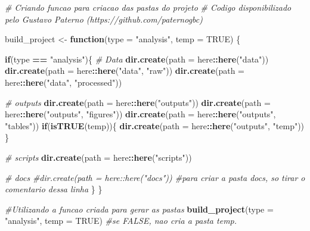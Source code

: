 \documentclass[
]{book}
\newenvironment{Shaded}{\begin{snugshade}}{\end{snugshade}}
\newcommand{\AttributeTok}[1]{\textcolor[rgb]{0.13,0.29,0.53}{#1}}
\newcommand{\CommentTok}[1]{\textcolor[rgb]{0.56,0.35,0.01}{\textit{#1}}}
\newcommand{\ConstantTok}[1]{\textcolor[rgb]{0.56,0.35,0.01}{#1}}
\newcommand{\ControlFlowTok}[1]{\textcolor[rgb]{0.13,0.29,0.53}{\textbf{#1}}}
\newcommand{\FunctionTok}[1]{\textcolor[rgb]{0.13,0.29,0.53}{\textbf{#1}}}
\newcommand{\NormalTok}[1]{#1}
\newcommand{\OtherTok}[1]{\textcolor[rgb]{0.56,0.35,0.01}{#1}}
\newcommand{\SpecialCharTok}[1]{\textcolor[rgb]{0.81,0.36,0.00}{\textbf{#1}}}
\newcommand{\StringTok}[1]{\textcolor[rgb]{0.31,0.60,0.02}{#1}}
\begin{document}
\begin{Shaded}
\begin{Highlighting}[]
\CommentTok{\# Criando funcao para criacao das pastas do projeto}
\CommentTok{\# Codigo disponibilizado pelo Gustavo Paterno (https://github.com/paternogbc)}

\NormalTok{build\_project }\OtherTok{\textless{}{-}} \ControlFlowTok{function}\NormalTok{(}\AttributeTok{type =} \StringTok{"analysis"}\NormalTok{,}
                          \AttributeTok{temp =} \ConstantTok{TRUE}\NormalTok{) \{}
  
  \ControlFlowTok{if}\NormalTok{(type }\SpecialCharTok{==} \StringTok{"analysis"}\NormalTok{)\{}
    \CommentTok{\# Data}
    \FunctionTok{dir.create}\NormalTok{(}\AttributeTok{path =}\NormalTok{ here}\SpecialCharTok{::}\FunctionTok{here}\NormalTok{(}\StringTok{"data"}\NormalTok{))}
    \FunctionTok{dir.create}\NormalTok{(}\AttributeTok{path =}\NormalTok{ here}\SpecialCharTok{::}\FunctionTok{here}\NormalTok{(}\StringTok{"data"}\NormalTok{, }\StringTok{"raw"}\NormalTok{))}
    \FunctionTok{dir.create}\NormalTok{(}\AttributeTok{path =}\NormalTok{ here}\SpecialCharTok{::}\FunctionTok{here}\NormalTok{(}\StringTok{"data"}\NormalTok{, }\StringTok{"processed"}\NormalTok{))}
    
    \CommentTok{\# outputs}
    \FunctionTok{dir.create}\NormalTok{(}\AttributeTok{path =}\NormalTok{ here}\SpecialCharTok{::}\FunctionTok{here}\NormalTok{(}\StringTok{"outputs"}\NormalTok{))}
    \FunctionTok{dir.create}\NormalTok{(}\AttributeTok{path =}\NormalTok{ here}\SpecialCharTok{::}\FunctionTok{here}\NormalTok{(}\StringTok{"outputs"}\NormalTok{, }\StringTok{"figures"}\NormalTok{))}
    \FunctionTok{dir.create}\NormalTok{(}\AttributeTok{path =}\NormalTok{ here}\SpecialCharTok{::}\FunctionTok{here}\NormalTok{(}\StringTok{"outputs"}\NormalTok{, }\StringTok{"tables"}\NormalTok{))}
    \ControlFlowTok{if}\NormalTok{(}\FunctionTok{isTRUE}\NormalTok{(temp))\{}
      \FunctionTok{dir.create}\NormalTok{(}\AttributeTok{path =}\NormalTok{ here}\SpecialCharTok{::}\FunctionTok{here}\NormalTok{(}\StringTok{"outputs"}\NormalTok{, }\StringTok{"temp"}\NormalTok{))}
\NormalTok{    \}}
    
    \CommentTok{\# scripts}
    \FunctionTok{dir.create}\NormalTok{(}\AttributeTok{path =}\NormalTok{ here}\SpecialCharTok{::}\FunctionTok{here}\NormalTok{(}\StringTok{"scripts"}\NormalTok{))}
    
    \CommentTok{\# docs}
    \CommentTok{\#dir.create(path = here::here("docs")) \#para criar a pasta docs, so tirar o comentario dessa linha}
\NormalTok{  \}}
\NormalTok{\}}

\CommentTok{\#Utilizando a funcao criada para gerar as pastas}
\FunctionTok{build\_project}\NormalTok{(}\AttributeTok{type =} \StringTok{"analysis"}\NormalTok{,}
              \AttributeTok{temp =} \ConstantTok{TRUE}\NormalTok{) }\CommentTok{\#se FALSE, nao cria a pasta temp.}
\end{Highlighting}
\end{Shaded}
\end{document}
